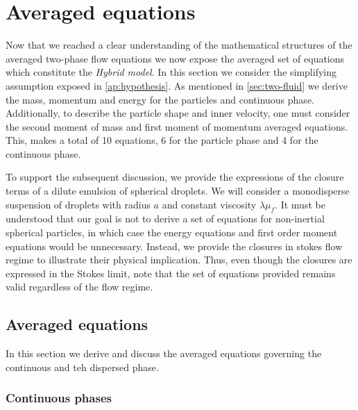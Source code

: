 \section{Averaged equations}



Now that we reached a clear understanding of the mathematical structures of the averaged two-phase flow equations we now expose the averaged set of equations which constitute the \textit{Hybrid model}. 
In this section we consider the simplifying assumption exposed in \ref{ap:hypothesis}. 
As mentioned in \ref{sec:two-fluid} we derive the mass, momentum and energy for the particles and continuous phase. 
Additionally, to describe the particle shape and inner velocity, one must consider the second moment of mass and first moment of momentum averaged equations. 
This, makes a total of 10 equations, 6 for the particle phase and 4 for the continuous phase.

To support the subsequent discussion, we provide the expressions of the closure terms of a dilute emulsion of spherical droplets. 
We will consider a monodisperse suspension of droplets with radius $a$ and constant viscosity $\lambda \mu_f$. 
It must be understood that our goal is not to derive a set of equations for non-inertial spherical particles, in which case the energy equations and first order moment equations would be unnecessary. 
Instead, we provide the closures in stokes flow regime to illustrate their physical implication. 
Thus, even though the closures are expressed in the Stokes limit, note that the set of equations provided remains valid regardless of the flow regime.


\subsection{Averaged equations}

In this section we derive and discuss the averaged equations governing the continuous and teh dispersed  phase. 

\subsubsection{Continuous phases}


